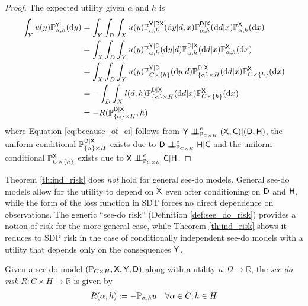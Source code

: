 \begin{proof}
The expected utility given $\alpha$ and $h$ is
\begin{align}
    \int_Y u(y)\mathbb{P}_{\alpha,h}^{\mathsf{Y}}(\mathrm{d}y) &= \int_Y  \int_D \int_{X} u(y)\mathbb{P}_{\alpha,h}^{\mathsf{Y}|\mathsf{DX}}(\mathrm{d}y|d,x)\mathbb{P}_{\alpha,h}^{\mathsf{D}|\mathsf{X}}(\mathrm{d}d|x)\mathbb{P}_{\alpha,h}^{\mathsf{X}}(\mathrm{d}x) \\
    &= \int_X  \int_D \int_{Y} u(y) \mathbb{P}_{\alpha,h}^{\mathsf{Y}|\mathsf{D}}(\mathrm{d}y|d)\mathbb{P}_{\alpha,h}^{\mathsf{D}|\mathsf{X}}(\mathrm{d}d|x)\mathbb{P}_{\alpha,h}^{\mathsf{X}}(\mathrm{d}x)\label{eq:because_of_ci}\\
    &= \int_{X} \int_D \int_Y u(y) \mathbb{P}_{C\times\{h\}}^{\mathsf{Y}|\mathsf{D}}(\mathrm{d}y|d)\mathbb{P}_{\{\alpha\}\times H}^{\mathsf{D}|\mathsf{X}}(\mathrm{d}d|x)\mathbb{P}_{C\times\{h\}}^{\mathsf{X}}(\mathrm{d}x)\\
     &= -\int_D\int_X l(d,h)\mathbb{P}_{\{\alpha\}\times H}^{\mathsf{D}|\mathsf{X}}(\mathrm{d}d|x)\mathbb{P}_{C\times\{h\}}^{\mathsf{X}}(\mathrm{d}x)\\
    &= -R(\mathbb{P}_{\{\alpha\}\times H}^{\mathsf{D}|\mathsf{X}},h)
\end{align}
where Equation \ref{eq:because_of_ci} follows from $\RV{Y}\CI^e_{\prob{P}_{C\times H}} (\RV{X,C})|(\RV{D},\RV{H})$, the uniform conditional $\mathbb{P}_{\{\alpha\}\times H}^{\mathsf{D}|\mathsf{X}}$ exists due to $\RV{D}\CI^e_{\prob{P}_{C\times H}} \RV{H}|\RV{C}$ and the uniform conditional $\mathbb{P}_{C\times\{h\}}^{\mathsf{X}}$ exists due to $\RV{X}\CI^e_{\prob{P}_{C\times H}} \RV{C}|\RV{H}$.
\end{proof}

Theorem \ref{th:ind_risk} does \emph{not} hold for general see-do models. General see-do models allow for the utility to depend on $\mathsf{X}$ even after conditioning on $\mathsf{D}$ and $\mathsf{H}$, while the form of the loss function in SDT forces no direct dependence on observations. The generic ``see-do risk'' (Definition \ref{def:see_do_risk}) provides a notion of risk for the more general case, while Theorem \ref{th:ind_risk} shows it reduces to SDP risk in the case of conditionally independent see-do models with a utility that depends only on the consequences $\mathsf{Y}$.
\begin{definition}\label{def:see_do_risk}
Given a see-do model $(\mathbb{P}_{C\times H}, \mathsf{X},\mathsf{Y},\mathsf{D})$ along with a utility $u:\Omega\to \mathbb{R}$, the \emph{see-do risk} $R:C\times H\to \mathbb{R}$ is given by
\begin{align}
    R(\alpha,h) &:= -\mathbb{P}_{\alpha,h}u&\forall \alpha\in C,h\in H
\end{align}
\end{definition}

